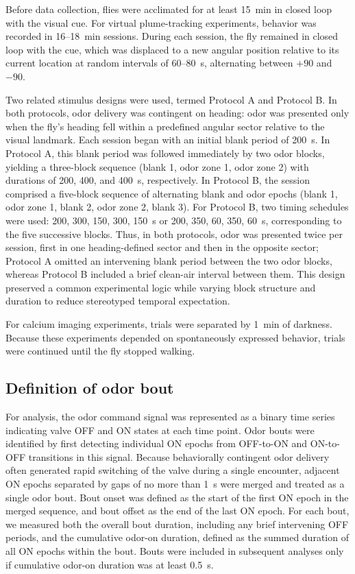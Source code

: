 Before data collection, flies were acclimated for at least 15~min in closed loop with the visual cue. For virtual plume-tracking experiments, behavior was recorded in 16--18~min sessions. During each session, the fly remained in closed loop with the cue, which was displaced to a new angular position relative to its current location at random intervals of 60--80~s, alternating between $+90$\textdegree{} and $-90$\textdegree{}.

Two related stimulus designs were used, termed Protocol A and Protocol B. In both protocols, odor delivery was contingent on heading: odor was presented only when the fly's heading fell within a predefined angular sector relative to the visual landmark. Each session began with an initial blank period of 200~s. In Protocol A, this blank period was followed immediately by two odor blocks, yielding a three-block sequence (blank 1, odor zone 1, odor zone 2) with durations of 200, 400, and 400~s, respectively. In Protocol B, the session comprised a five-block sequence of alternating blank and odor epochs (blank 1, odor zone 1, blank 2, odor zone 2, blank 3). For Protocol B, two timing schedules were used: 200, 300, 150, 300, 150~s or 200, 350, 60, 350, 60~s, corresponding to the five successive blocks. Thus, in both protocols, odor was presented twice per session, first in one heading-defined sector and then in the opposite sector; Protocol A omitted an intervening blank period between the two odor blocks, whereas Protocol B included a brief clean-air interval between them. This design preserved a common experimental logic while varying block structure and duration to reduce stereotyped temporal expectation.

For calcium imaging experiments, trials were separated by 1~min of darkness. Because these experiments depended on spontaneously expressed behavior, trials were continued until the fly stopped walking.

\subsection{Definition of odor bout}

For analysis, the odor command signal was represented as a binary time series indicating valve OFF and ON states at each time point. Odor bouts were identified by first detecting individual ON epochs from OFF-to-ON and ON-to-OFF transitions in this signal. Because behaviorally contingent odor delivery often generated rapid switching of the valve during a single encounter, adjacent ON epochs separated by gaps of no more than 1~s were merged and treated as a single odor bout. Bout onset was defined as the start of the first ON epoch in the merged sequence, and bout offset as the end of the last ON epoch. For each bout, we measured both the overall bout duration, including any brief intervening OFF periods, and the cumulative odor-on duration, defined as the summed duration of all ON epochs within the bout. Bouts were included in subsequent analyses only if cumulative odor-on duration was at least 0.5~s.


